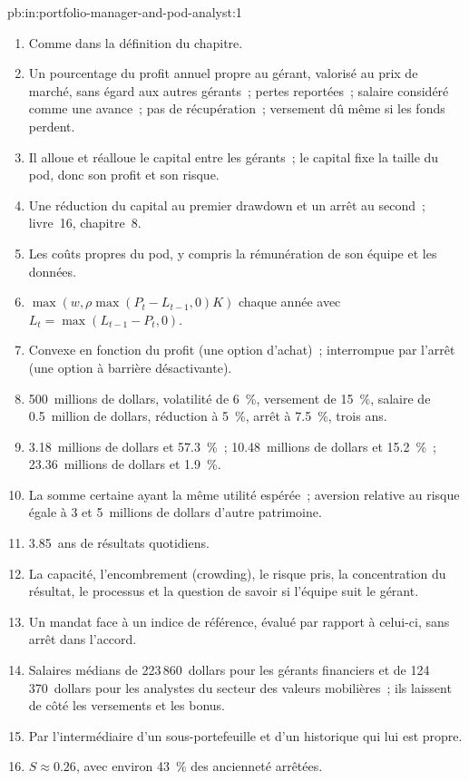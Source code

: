 \begin{solution}{pb:in:portfolio-manager-and-pod-analyst:1}
\begin{enumerate}
\item Comme dans la définition du chapitre.
\item Un pourcentage du profit annuel propre au gérant, valorisé au prix de marché, sans égard aux autres gérants~; pertes
reportées~; salaire considéré comme une avance~; pas de récupération~; versement dû même si les fonds perdent.
\item Il alloue et réalloue le capital entre les gérants~; le capital fixe la taille du pod, donc son profit et son risque.
\item Une réduction du capital au premier drawdown et un arrêt au second~; livre~16, chapitre~8.
\item Les coûts propres du pod, y compris la rémunération de son équipe et les données.
\item $\max(w,\rho\max(P_t-L_{t-1},0)K)$ chaque année avec $L_t=\max(L_{t-1}-P_t,0)$.
\item Convexe en fonction du profit (une option d'achat)~; interrompue par l'arrêt (une option à barrière désactivante).
\item 500~millions de dollars, volatilité de 6~\%, versement de 15~\%, salaire de 0.5~million de dollars, réduction à 5~\%, arrêt à 7.5~\%, trois ans.
\item 3.18~millions de dollars et 57.3~\%~; 10.48~millions de dollars et 15.2~\%~; 23.36~millions de dollars et 1.9~\%.
\item La somme certaine ayant la même utilité espérée~; aversion relative au risque égale à 3 et 5~millions de dollars d'autre patrimoine.
\item 3.85~ans de résultats quotidiens.
\item La capacité, l'encombrement (crowding), le risque pris, la concentration du résultat, le processus et la question de savoir si l'équipe suit le gérant.
\item Un mandat face à un indice de référence, évalué par rapport à celui-ci, sans arrêt dans l'accord.
\item Salaires médians de 223\,860~dollars pour les gérants financiers et de 124\,370~dollars pour les analystes du secteur des valeurs mobilières~; ils laissent
de côté les versements et les bonus.
\item Par l'intermédiaire d'un sous-portefeuille et d'un historique qui lui est propre.
\item $S\approx0.26$, avec environ 43~\% des ancienneté arrêtées.

\end{enumerate}
\end{solution}
